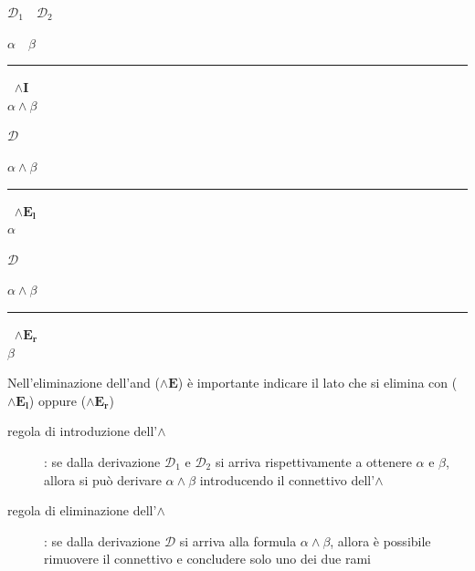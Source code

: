 \documentclass[a4paper, 12pt]{book}
\newcommand{\definizione}[2]{%
\vspace{15pt}%
\begin{tcolorbox}[
  colback=cyan!5!white,
  colframe=blue!50!black,
  title=\textbf{Definizione: #1}, %
  coltitle=white,
  fonttitle=\bfseries,
  arc=3mm,
  boxrule=0.5pt,
  enhanced,
  breakable
]
#2 %
\end{tcolorbox}
\vspace{15pt}%
}
\begin{document}
  \definizione{regole della congiunzione}{
    \begin{center}
      \begin{minipage}[t]{0.30  \textwidth}
      \centering
      \(\mathcal{D}_{1} \quad \mathcal{D}_{2}\)

      \(\alpha \quad \beta\)\\[-0.7em] %
      \hspace{1cm} \rule{2cm}{0.4pt} \(\;\; \boldsymbol{\land I}\)\\  
      \(
      \alpha \land \beta
      \) 
      \end{minipage}
      \begin{minipage}[t]{0.30\textwidth}
      \centering
      \(\mathcal{D}\)

      \(\alpha \land \beta\)\\[-0.7em] %
      \hspace{1cm} \rule{2cm}{0.4pt} \(\;\; \boldsymbol{\land E_l}\)\\  
      \(
      \alpha
      \) 
      \end{minipage}
      \begin{minipage}[t]{0.30\textwidth}
      \centering
      \(\mathcal{D}\)

      \(\alpha \land \beta \)\\[-0.7em] %
      \hspace{1cm} \rule{2cm}{0.4pt} \(\;\; \boldsymbol{\land E_r}\)\\  
      \(
      \beta
      \) 
      \end{minipage}
  \end{center}

  Nell'eliminazione dell'and (\(\boldsymbol{\land E}\)) è importante indicare il lato che si elimina con (\(\boldsymbol{\land E_l}\)) oppure (\(\boldsymbol{\land E_r}\))
  }
  
  \begin{description}
    \item [regola di introduzione dell'$\land$]: se dalla derivazione $\mathcal{D}_{1}$ e $\mathcal{D}_{2}$ si arriva rispettivamente a ottenere $\alpha$ e $\beta$, allora si può derivare $\alpha \land \beta$ introducendo il connettivo dell'$\land$
    \item [regola di eliminazione dell'$\land$]: se dalla derivazione $\mathcal{D}$ si arriva alla formula $\alpha \land \beta$, allora è possibile rimuovere il connettivo e concludere solo uno dei due rami 
  \end{description}
\end{document}
